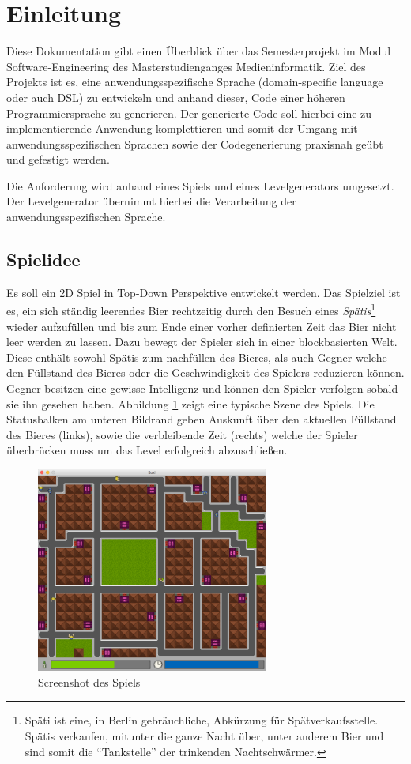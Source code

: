 \section{Einleitung}

Diese Dokumentation gibt einen Überblick über das Semesterprojekt im Modul Software-Engineering des Masterstudienganges Medieninformatik.
Ziel des Projekts ist es, eine anwendungsspezifische Sprache (domain-specific language oder auch DSL) zu entwickeln und anhand dieser, Code einer höheren Programmiersprache zu generieren.
Der generierte Code soll hierbei eine zu implementierende Anwendung komplettieren und somit der Umgang mit anwendungsspezifischen Sprachen sowie der Codegenerierung praxisnah geübt und gefestigt werden.

Die Anforderung wird anhand eines Spiels und eines Levelgenerators umgesetzt.
Der Levelgenerator übernimmt hierbei die Verarbeitung der anwendungsspezifischen Sprache.

\subsection{Spielidee}

Es soll ein 2D Spiel in Top-Down Perspektive entwickelt werden.
Das Spielziel ist es, ein sich ständig leerendes Bier rechtzeitig durch den Besuch eines \textit{Spätis}\footnote{Späti ist eine, in Berlin gebräuchliche, Abkürzung für Spätverkaufsstelle. Spätis verkaufen, mitunter die ganze Nacht über, unter anderem Bier und sind somit die ``Tankstelle'' der trinkenden Nachtschwärmer.}
wieder aufzufüllen und bis zum Ende einer vorher definierten Zeit das Bier nicht leer werden zu lassen.
Dazu bewegt der Spieler sich in einer blockbasierten Welt.
Diese enthält sowohl Spätis zum nachfüllen des Bieres, als auch Gegner welche den Füllstand des Bieres oder die Geschwindigkeit des Spielers reduzieren können.
Gegner besitzen eine gewisse Intelligenz und können den Spieler verfolgen sobald sie ihn gesehen haben.
Abbildung \ref{fig:einleitung:screenshot} zeigt eine typische Szene des Spiels.
Die Statusbalken am unteren Bildrand geben Auskunft über den aktuellen Füllstand des Bieres (links), sowie die verbleibende Zeit (rechts) welche der Spieler überbrücken muss um das Level erfolgreich abzuschließen.

\begin{figure}[]
\centering
\includegraphics[width=3in]{img/02_screenshot.png}
\caption{Screenshot des Spiels}
\label{fig:einleitung:screenshot}
\end{figure}


